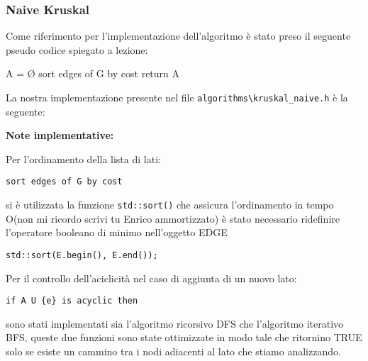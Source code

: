 \documentclass[]{article}
\begin{document}
\subsubsection{Naive Kruskal}
\begin{flushleft}
Come riferimento per l'implementazione dell'algoritmo è stato preso il seguente pseudo codice spiegato a lezione:

\begin{algorithm}[H]
\SetAlgoLined
\DontPrintSemicolon
{}
	A = Ø\;
	sort edges of G by cost\;
	return A\;
\caption{Kruskal Naive}
\end{algorithm}
La nostra implementazione presente nel file \verb|algorithms\kruskal_naive.h| è la seguente:

\lstset{language=c++, style=mystyle}


\textbf{Note implementative:}

\medskip
Per l'ordinamento della lista di lati:

\begin{lstlisting}
sort edges of G by cost
\end{lstlisting}

\smallskip
si è utilizzata la funzione \verb|std::sort()| che assicura l'ordinamento in tempo O(non mi ricordo scrivi tu Enrico ammortizzato)%
 è stato necessario ridefinire l'operatore booleano di minimo nell'oggetto EDGE
 
\lstset{language=c++, style=mystyle, firstnumber=2} 	 	
\begin{lstlisting}
std::sort(E.begin(), E.end());
\end{lstlisting}

\medskip
Per il controllo dell'aciclicità nel caso di aggiunta di un nuovo lato:

\begin{lstlisting}
if A U {e} is acyclic then
\end{lstlisting}

\smallskip
sono stati implementati sia l'algoritmo ricorsivo DFS che l'algoritmo iterativo BFS, queste due funzioni sono state ottimizzate in modo tale che ritornino TRUE solo se esiste un cammino tra i nodi adiacenti al lato che stiamo analizzando.


\end{flushleft}
\end{document}
